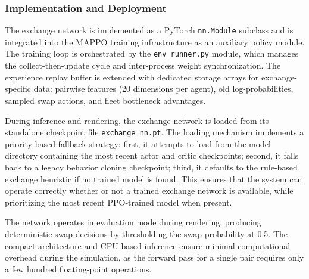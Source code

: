 \subsubsection{Implementation and Deployment}

The exchange network is implemented as a PyTorch \texttt{nn.Module} subclass and is integrated into the MAPPO training infrastructure as an auxiliary policy module. The training loop is orchestrated by the \texttt{env\_runner.py} module, which manages the collect-then-update cycle and inter-process weight synchronization. The experience replay buffer is extended with dedicated storage arrays for exchange-specific data: pairwise features (20 dimensions per agent), old log-probabilities, sampled swap actions, and fleet bottleneck advantages.

During inference and rendering, the exchange network is loaded from its standalone checkpoint file \texttt{exchange\_nn.pt}. The loading mechanism implements a priority-based fallback strategy: first, it attempts to load from the model directory containing the most recent actor and critic checkpoints; second, it falls back to a legacy behavior cloning checkpoint; third, it defaults to the rule-based exchange heuristic if no trained model is found. This ensures that the system can operate correctly whether or not a trained exchange network is available, while prioritizing the most recent PPO-trained model when present.

The network operates in evaluation mode during rendering, producing deterministic swap decisions by thresholding the swap probability at 0.5. The compact architecture and CPU-based inference ensure minimal computational overhead during the simulation, as the forward pass for a single pair requires only a few hundred floating-point operations.
